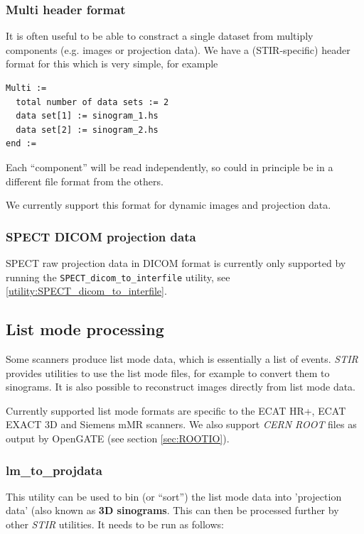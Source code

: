 \documentclass{article}
\begin{document}
\subsubsection{Multi header format}
\label{multi-file-format}
It is often useful to be able to constract a single dataset from multiply components (e.g. images
or projection data). We have a (STIR-specific) header format for this which is very simple, for example
\begin{verbatim}
Multi :=
  total number of data sets := 2
  data set[1] := sinogram_1.hs
  data set[2] := sinogram_2.hs
end :=
\end{verbatim}
Each ``component'' will be read independently, so could in principle be in a different file format
from the others.

We currently support this format for dynamic images and projection data.

\subsubsection{SPECT DICOM projection data}
SPECT raw projection data in DICOM format is currently only supported by running the  \texttt{SPECT\_dicom\_to\_interfile} utility,
see \ref{utility:SPECT_dicom_to_interfile}.

\subsection{
List mode processing}
\label{sec:listmodeprocessing}

Some scanners produce list mode data, which is essentially a 
list of events. \textit{STIR} provides utilities to use
the list mode files, for example to convert them to sinograms. It is
also possible to reconstruct images directly from list mode data.

Currently supported list mode formats are specific to the ECAT 
HR+, ECAT EXACT 3D and Siemens mMR scanners. We also support \textit{CERN ROOT} files
as output by OpenGATE (see section \ref{sec:ROOTIO}).

\subsubsection{
lm\_to\_projdata}

This utility can be used to bin (or ``sort'') the list mode data 
into 'projection data' (also known as \textbf{3D sinograms}. 
This can then be processed further by other \textit{STIR} utilities. It 
needs to be run as follows:
\end{document}
